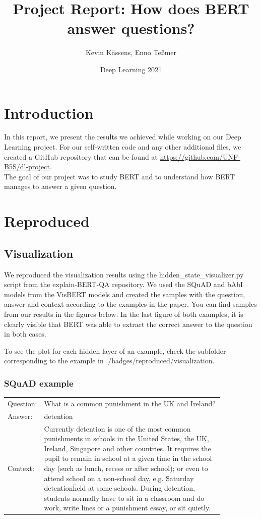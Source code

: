 \documentclass{article}
\title{Project Report: How does BERT answer questions?}
\author{Kevin Kässens, Enno Teßmer}
\date{Deep Learning 2021}
\begin{document}
	\maketitle
	\section{Introduction}
	In this report, we present the results we achieved while working on our Deep Learning project. For our self-written code and any other additional files, we created a GitHub repository that can be found at \url{https://github.com/UNF-B5S/dl-project}.\\
	
	The goal of our project was to study BERT and to understand how BERT manages to answer a given question. 
	
	\section{Reproduced}
	\subsection{Visualization}
	We reproduced the visualization results using the hidden\_state\_visualizer.py script from the explain-BERT-QA repository. We used the SQuAD and bAbI models from the VisBERT models and created the samples with the question, answer and context according to the examples in the paper.
	You can find samples from our results in the figures below. In the last figure of both examples, it is clearly visible that BERT was able to extract the correct answer to the question in both cases.
	
	To see the plot for each hidden layer of an example, check the subfolder corresponding to the example in ./badges/reproduced/visualization.
	
	\subsubsection{SQuAD example}
	
	\begin{tabular}{ l p{0.85\linewidth} }
		Question: & What is a common punishment in the UK and Ireland? \\
		Answer: & detention \\
		Context: & Currently detention is one of the most common punishments in schools in the United States, the UK, Ireland, Singapore and other countries. It requires the pupil to remain in school at a given time in the school day (such as lunch, recess or after school); or even to attend school on a non-school day, e.g. \"Saturday detention\" held at some schools. During detention, students normally have to sit in a classroom and do work, write lines or a punishment essay, or sit quietly. \\
	\end{tabular}
	
\end{document}
